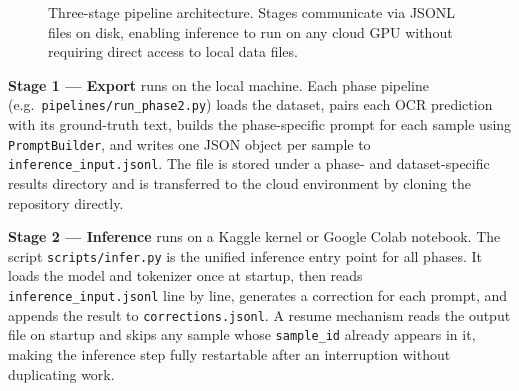 \begin{figure}[ht]
\centering
{}
\caption{Three-stage pipeline architecture. Stages communicate via JSONL files on disk,
         enabling inference to run on any cloud GPU without requiring direct access to
         local data files.}
\label{fig:pipeline}
\end{figure}

\textbf{Stage 1 --- Export} runs on the local machine.
Each phase pipeline (e.g.\ \texttt{pipelines/run\_phase2.py}) loads the dataset,
pairs each OCR prediction with its ground-truth text, builds the phase-specific
prompt for each sample using \texttt{PromptBuilder}, and writes one JSON object
per sample to \texttt{inference\_input.jsonl}.
The file is stored under a phase- and dataset-specific results directory and is
transferred to the cloud environment by cloning the repository directly.

\textbf{Stage 2 --- Inference} runs on a Kaggle kernel or Google Colab notebook.
The script \texttt{scripts/infer.py} is the unified inference entry point for all
phases.
It loads the model and tokenizer once at startup, then reads
\texttt{inference\_input.jsonl} line by line, generates a correction for each
prompt, and appends the result to \texttt{corrections.jsonl}.
A resume mechanism reads the output file on startup and skips any sample whose
\texttt{sample\_id} already appears in it, making the inference step fully
restartable after an interruption without duplicating work.

